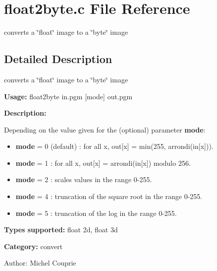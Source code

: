 \section{float2byte.c File Reference}
\label{float2byte_8c}
converts a \char`\"{}float\char`\"{} image to a \char`\"{}byte\char`\"{} image  




\label{_details}
\subsection{Detailed Description}
converts a \char`\"{}float\char`\"{} image to a \char`\"{}byte\char`\"{} image 

{\bf Usage:} float2byte in.pgm [mode] out.pgm

{\bf Description:}

Depending on the value given for the (optional) parameter {\bf mode}: \begin{itemize}
\item {\bf mode} = 0 (default) : for all x, out[x] = min(255, arrondi(in[x])). \item {\bf mode} = 1 : for all x, out[x] = arrondi(in[x]) modulo 256. \item {\bf mode} = 2 : scales values in the range 0-255. \item {\bf mode} = 4 : truncation of the square root in the range 0-255. \item {\bf mode} = 5 : truncation of the log in the range 0-255.\end{itemize}
{\bf Types supported:} float 2d, float 3d

{\bf Category:} convert

\begin{Desc}
\item[Author:]Michel Couprie \end{Desc}
